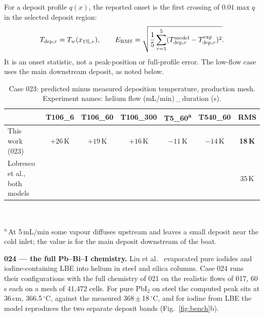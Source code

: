 \documentclass[10pt,a4paper]{article}
\newcommand{\PbI}{\ensuremath{\mathrm{PbI}_2}}
\begin{document}
For a deposit profile $q(x)$, the reported onset is the first crossing
of $0.01\max q$ in the selected deposit region:
\begin{equation}
 T_{{\rm dep},r}=T_w(x_{1\%,r}),\qquad
 E_{\rm RMS}=\sqrt{\frac{1}{5}\sum_{r=1}^{5}
 (T_{{\rm dep},r}^{\rm model}-T_{{\rm dep},r}^{\rm exp})^2}.
\end{equation}
It is an onset statistic, not a peak-position or full-profile error.
The low-flow case uses the main downstream deposit, as noted below.

\begin{table}[h]
  \centering\small
  \caption{Case 023: predicted minus measured deposition temperature,
  production mesh. Experiment names: helium flow (mL/min)\,\_\,duration (s).}
  \label{tab:023}
  \begin{tabular}{l*{6}{c}}
    \toprule
    & T106\_6 & T106\_60 & T106\_300 & T5\_60\textsuperscript{a} & T540\_60 & \textbf{RMS} \\
    \midrule
    This work (023) & $+26$\,K & $+19$\,K & $+16$\,K & $-11$\,K & $-14$\,K & \textbf{18\,K} \\
    Lobresco et al., both models & & & & & & 35\,K \\
    \bottomrule
  \end{tabular}\\[0.3em]
  \parbox{0.86\textwidth}{\footnotesize\color{PSIgray}\textsuperscript{a}\,At 5\,mL/min some vapour
  diffuses upstream and leaves a small deposit near the cold inlet; the
  value is for the main deposit downstream of the boat.}
\end{table}

\textbf{024 --- the full Pb--Bi--I chemistry.} Liu et
al.~\cite{Liu2025} evaporated pure iodides and iodine-containing LBE into
helium in steel and silica columns. Case 024 runs their configurations with
the full chemistry of 021 on the realistic flows of 017, 60\,s each on a
mesh of 41,472 cells. For pure \PbI{} on steel the computed peak sits at
36\,cm, 366.5\,$^\circ$C, against the measured 368\,$\pm$\,18\,$^\circ$C,
and for iodine from LBE the model reproduces the two separate deposit bands
(Fig.~\ref{fig:bench}b).
\end{document}
